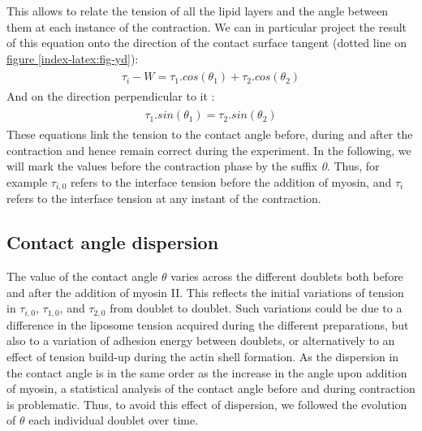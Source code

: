 \documentclass[A4paperpaper,11pt,english]{sphinxmanual}
\begin{document}
This allows
to relate the tension of all the lipid layers and the angle
between them at each instance of the contraction. We can in particular project
the result of this equation onto the direction of the contact surface
tangent (dotted line on \hyperref[index-latex:fig-yd]{figure  \ref*{index-latex:fig-yd}}):
\label{index-latex:equation-young-tangent}\begin{gather}
\begin{split}\tau_i - W = \tau_1.cos(\theta_1) + \tau_2.cos(\theta_2)\end{split}\label{index-latex-young-tangent}
\end{gather}
And on the direction perpendicular to it :
\label{index-latex:equation-young-perpendicular}\begin{gather}
\begin{split} \tau_1.sin(\theta_1) = \tau_2.sin(\theta_2)\end{split}\label{index-latex-young-perpendicular}
\end{gather}
These equations link the tension to the contact angle before, during and
after the contraction and hence remain correct during the experiment. In the following, we will mark the values
before the contraction phase by
the suffix \emph{0}. Thus, for example \(\tau_{i,0}\) refers to the
interface tension before the addition of myosin, and \(\tau_i\) refers to the
interface tension at any instant of the contraction.


\subsection{Contact angle dispersion}
\label{index-latex:contact-angle-dispersion}
The value of the contact angle \(\theta\) varies across the different doublets both before
and after the  addition of myosin II. This reflects the initial variations of tension in
\(\tau_{i,0}\), \(\tau_{1,0}\), and \(\tau_{2,0}\) from doublet to doublet. Such variations could be
due to a difference in the liposome tension acquired during the different preparations, but also to a
variation of adhesion energy between doublets, or alternatively to an effect of tension build-up
during the actin shell formation. As the dispersion in the contact angle is
in the same order as the increase in the angle upon addition of myosin, a
statistical analysis of the contact angle before and during contraction is
problematic. Thus, to avoid this effect of dispersion, we followed the evolution of
\(\theta\) each individual doublet over time.
\end{document}
